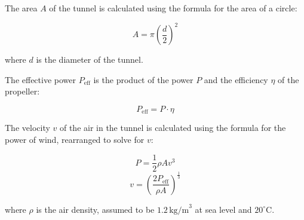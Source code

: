 \documentclass{article}
\begin{document}
The area $A$ of the tunnel is calculated using the formula for the area of a circle:

\begin{equation}
A = \pi \left(\frac{d}{2}\right)^2
\end{equation}

where $d$ is the diameter of the tunnel.

The effective power $P_{\text{eff}}$ is the product of the power $P$ and the efficiency $\eta$ of the propeller:

\begin{equation}
P_{\text{eff}} = P \cdot \eta
\end{equation}

The velocity $v$ of the air in the tunnel is calculated using the formula for the power of wind, rearranged to solve for $v$:

$$P = \frac{1}{2} \rho A v^3$$
\begin{equation}
v = \left(\frac{2 P_{\text{eff}}}{\rho A}\right)^{\frac{1}{3}}
\end{equation}

where $\rho$ is the air density, assumed to be $1.2 \, \text{kg/m}^3$ at sea level and $20^\circ \text{C}$.
\end{document}
